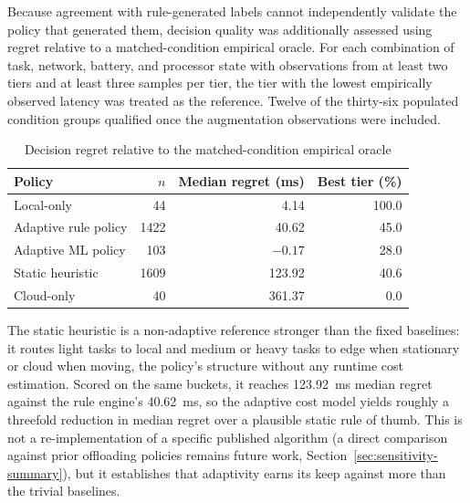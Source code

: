 Because agreement with rule-generated labels cannot independently validate the
policy that generated them, decision quality was additionally assessed using
regret relative to a matched-condition empirical oracle. For each combination of
task, network, battery, and processor state with observations from at least two
tiers and at least three samples per tier, the tier with the lowest empirically
observed latency was treated as the reference. Twelve of the thirty-six populated
condition groups qualified once the augmentation observations were included.

\begin{table}[t]
\centering
\caption{Decision regret relative to the matched-condition empirical oracle}
\label{tab:regret}
\footnotesize
\begin{tabular}{lrrr}
\toprule
Policy & $n$ & Median regret (ms) & Best tier (\%) \\
\midrule
Local-only & 44 & 4.14 & 100.0 \\
Adaptive rule policy & 1422 & 40.62 & 45.0 \\
Adaptive ML policy & 103 & $-0.17$ & 28.0 \\
Static heuristic & 1609 & 123.92 & 40.6 \\
Cloud-only & 40 & 361.37 & 0.0 \\
\bottomrule
\end{tabular}
\end{table}

The static heuristic is a non-adaptive reference stronger than the fixed
baselines: it routes light tasks to local and medium or heavy tasks to edge when
stationary or cloud when moving, the policy's structure without any runtime cost
estimation. Scored on the same buckets, it reaches 123.92~ms median regret
against the rule engine's 40.62~ms, so the adaptive cost model yields roughly a
threefold reduction in median regret over a plausible static rule of thumb. This
is not a re-implementation of a specific published algorithm (a direct comparison
against prior offloading policies remains future work,
Section~\ref{sec:sensitivity-summary}), but it establishes that adaptivity earns
its keep against more than the trivial baselines.


